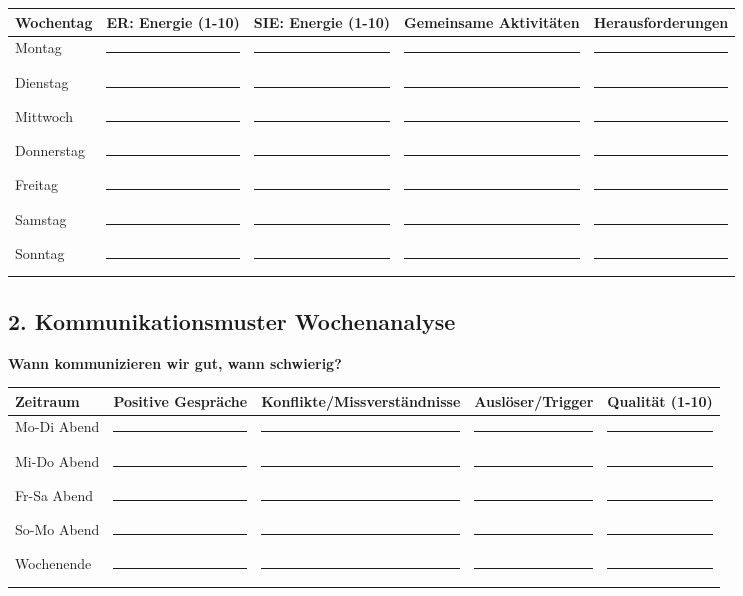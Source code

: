 {\begin{center}
\begin{tabular}{|p{2cm}|p{2.5cm}|p{2.5cm}|p{3cm}|p{3cm}|}
\hline
\textbf{Wochentag} & \textbf{ER: Energie (1-10)} & \textbf{SIE: Energie (1-10)} & \textbf{Gemeinsame Aktivitäten} & \textbf{Herausforderungen} \\
\hline
Montag & \rule{2cm}{0.4pt} & \rule{2cm}{0.4pt} & \rule{2.5cm}{0.4pt} & \rule{2.5cm}{0.4pt} \\
\hline
Dienstag & \rule{2cm}{0.4pt} & \rule{2cm}{0.4pt} & \rule{2.5cm}{0.4pt} & \rule{2.5cm}{0.4pt} \\
\hline
Mittwoch & \rule{2cm}{0.4pt} & \rule{2cm}{0.4pt} & \rule{2.5cm}{0.4pt} & \rule{2.5cm}{0.4pt} \\
\hline
Donnerstag & \rule{2cm}{0.4pt} & \rule{2cm}{0.4pt} & \rule{2.5cm}{0.4pt} & \rule{2.5cm}{0.4pt} \\
\hline
Freitag & \rule{2cm}{0.4pt} & \rule{2cm}{0.4pt} & \rule{2.5cm}{0.4pt} & \rule{2.5cm}{0.4pt} \\
\hline
Samstag & \rule{2cm}{0.4pt} & \rule{2cm}{0.4pt} & \rule{2.5cm}{0.4pt} & \rule{2.5cm}{0.4pt} \\
\hline
Sonntag & \rule{2cm}{0.4pt} & \rule{2cm}{0.4pt} & \rule{2.5cm}{0.4pt} & \rule{2.5cm}{0.4pt} \\
\hline
\end{tabular}
\end{center}

\hypertarget{kommunikationsmuster-wochenanalyse}{%
\subsection{2. Kommunikationsmuster Wochenanalyse}}\label{kommunikationsmuster-wochenanalyse}

\textbf{Wann kommunizieren wir gut, wann schwierig?}

\begin{center}
\begin{tabular}{|p{2cm}|p{3cm}|p{3cm}|p{4cm}|p{2cm}|}
\hline
\textbf{Zeitraum} & \textbf{Positive Gespräche} & \textbf{Konflikte/Missverständnisse} & \textbf{Auslöser/Trigger} & \textbf{Qualität (1-10)} \\
\hline
Mo-Di Abend & \rule{2.5cm}{0.4pt} & \rule{2.5cm}{0.4pt} & \rule{3.5cm}{0.4pt} & \rule{1.5cm}{0.4pt} \\
\hline
Mi-Do Abend & \rule{2.5cm}{0.4pt} & \rule{2.5cm}{0.4pt} & \rule{3.5cm}{0.4pt} & \rule{1.5cm}{0.4pt} \\
\hline
Fr-Sa Abend & \rule{2.5cm}{0.4pt} & \rule{2.5cm}{0.4pt} & \rule{3.5cm}{0.4pt} & \rule{1.5cm}{0.4pt} \\
\hline
So-Mo Abend & \rule{2.5cm}{0.4pt} & \rule{2.5cm}{0.4pt} & \rule{3.5cm}{0.4pt} & \rule{1.5cm}{0.4pt} \\
\hline
Wochenende & \rule{2.5cm}{0.4pt} & \rule{2.5cm}{0.4pt} & \rule{3.5cm}{0.4pt} & \rule{1.5cm}{0.4pt} \\
\hline
\end{tabular}
\end{center}

}
